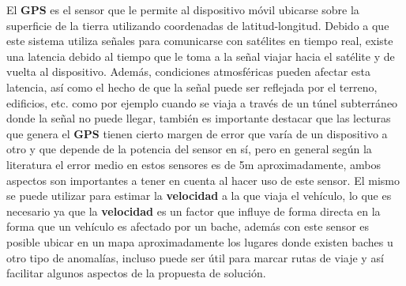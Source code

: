 	El \textbf{GPS} es el sensor que le permite al dispositivo móvil ubicarse sobre la superficie de la tierra utilizando 
	coordenadas de latitud-longitud. Debido a que este sistema utiliza señales para comunicarse con satélites en 
	tiempo real, existe una latencia debido al tiempo que le toma a la señal viajar hacia el satélite y de vuelta 
	al dispositivo. Además, condiciones atmosféricas pueden afectar esta latencia, así como el hecho de que la señal 
	puede ser reflejada por el terreno, edificios, etc. como por ejemplo cuando se viaja a través de un túnel subterráneo 
	donde la señal no puede llegar, también es importante destacar que las lecturas que genera el \textbf{GPS} tienen cierto 
	margen de error que varía de un dispositivo a otro y que depende de la potencia del sensor en sí, pero en general según la 
	literatura el error medio en estos sensores es de 5m aproximadamente, ambos aspectos son importantes a tener en cuenta al 
	hacer uso de este sensor. El mismo se puede utilizar para estimar la \textbf{velocidad} a la que viaja el vehículo, lo que
	es necesario ya que la \textbf{velocidad} es un factor que influye de forma directa en la forma que un vehículo es afectado
	por un bache, además con este sensor es posible ubicar en un mapa aproximadamente los lugares donde existen baches u otro
	tipo de anomalías, incluso puede ser útil para marcar rutas de viaje y así facilitar algunos aspectos de la propuesta de
	solución.



